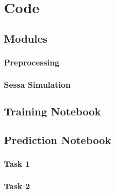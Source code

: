 

\chapter{Code} %

\label{AppendixA} %

\section{Modules}

\subsection{Preprocessing}



\subsection{Sessa Simulation}



\section{Training Notebook}

\section{Prediction Notebook}

\subsection{Task 1}

\subsection{Task 2}